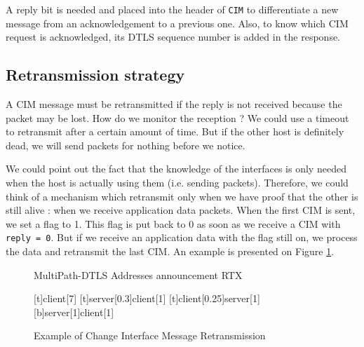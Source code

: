 A reply bit is needed and placed into the header of \verb!CIM! to differentiate a new message from an acknowledgement to a previous one. Also, to know which CIM request is acknowledged, its DTLS sequence number is added in the response.

\subsection{Retransmission strategy}


A CIM message must be retransmitted if the reply is not received because the packet may be lost. How do we monitor the reception ? We could use a timeout to retransmit after a certain amount of time. But if the other host is definitely dead, we will send packets for nothing before we notice. 

We could point out the fact that the knowledge of the interfaces is only needed when the host is actually using them (i.e. sending packets). Therefore, we could think of a mechanism which retransmit only when we have proof that the other is still alive : when we receive application data packets. When the first CIM is sent, we set a flag to 1. This flag is put back to 0 as soon as we receive a CIM with \verb$reply = 0$. But if we receive an application data with the flag still on, we process the data and retransmit the last CIM. An example is presented on Figure \ref{fig:CIMexchange2}.

\begin{figure}[!h]
\centering
\begin{msc}[r]{MultiPath-DTLS Addresses announcement RTX}

\setlength{\instfootheight}{0em}
\setlength{\instheadheight}{0em}
\setlength{\instdist}{0.7\linewidth}
\setlength{\levelheight}{3em}


[t]{}{client}[7]
\nextlevel
{}[t]{server}[0.3]{client}[1]
\nextlevel
{}[t]{client}[0.25]{server}[1]
\nextlevel
{}[b]{server}[1]{client}[1]
\nextlevel
\nextlevel

\end{msc}
\caption{Example of Change Interface Message Retransmission}
\label{fig:CIMexchange2}
\end{figure}

